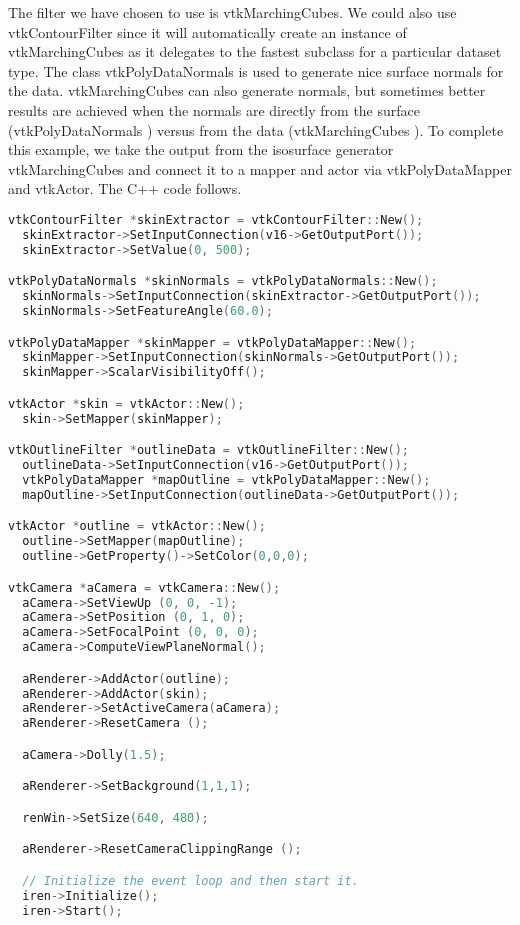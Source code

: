 The filter we have chosen to use is vtkMarchingCubes. We could also use vtkContourFilter since it will automatically create an instance of vtkMarchingCubes as it delegates to the fastest subclass for a particular dataset type. The class vtkPolyDataNormals is used to generate nice surface normals for the data. vtkMarchingCubes can also generate normals, but sometimes better results are achieved when the normals are directly from the surface (vtkPolyDataNormals ) versus from the data (vtkMarchingCubes ). To complete this example, we take the output from the isosurface generator vtkMarchingCubes and connect it to a mapper and actor via
vtkPolyDataMapper and vtkActor. The C++ code follows.

\begin{lstlisting}[language=C++, caption={Creating an isosurface.}]
vtkContourFilter *skinExtractor = vtkContourFilter::New();
  skinExtractor->SetInputConnection(v16->GetOutputPort());
  skinExtractor->SetValue(0, 500);

vtkPolyDataNormals *skinNormals = vtkPolyDataNormals::New();
  skinNormals->SetInputConnection(skinExtractor->GetOutputPort());
  skinNormals->SetFeatureAngle(60.0);

vtkPolyDataMapper *skinMapper = vtkPolyDataMapper::New();
  skinMapper->SetInputConnection(skinNormals->GetOutputPort());
  skinMapper->ScalarVisibilityOff();

vtkActor *skin = vtkActor::New();
  skin->SetMapper(skinMapper);

vtkOutlineFilter *outlineData = vtkOutlineFilter::New();
  outlineData->SetInputConnection(v16->GetOutputPort());
  vtkPolyDataMapper *mapOutline = vtkPolyDataMapper::New();
  mapOutline->SetInputConnection(outlineData->GetOutputPort());

vtkActor *outline = vtkActor::New();
  outline->SetMapper(mapOutline);
  outline->GetProperty()->SetColor(0,0,0);

vtkCamera *aCamera = vtkCamera::New();
  aCamera->SetViewUp (0, 0, -1);
  aCamera->SetPosition (0, 1, 0);
  aCamera->SetFocalPoint (0, 0, 0);
  aCamera->ComputeViewPlaneNormal();

  aRenderer->AddActor(outline);
  aRenderer->AddActor(skin);
  aRenderer->SetActiveCamera(aCamera);
  aRenderer->ResetCamera ();

  aCamera->Dolly(1.5);

  aRenderer->SetBackground(1,1,1);

  renWin->SetSize(640, 480);

  aRenderer->ResetCameraClippingRange ();

  // Initialize the event loop and then start it.
  iren->Initialize();
  iren->Start();
\end{lstlisting}

